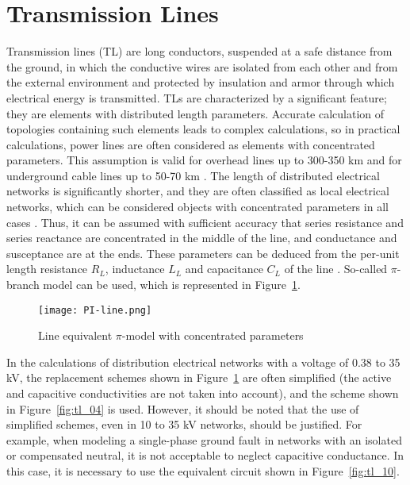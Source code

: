 \section{Transmission Lines}\label{sec:ch3/sec3}
Transmission lines (TL) are long conductors, suspended at a safe distance from the ground, in which the conductive wires are isolated from each other and from the external environment and protected by insulation and armor through which electrical energy is transmitted. TLs are characterized by a significant feature; they are elements with distributed length parameters. Accurate calculation of topologies containing such elements leads to complex calculations, so in practical calculations, power lines are often considered as elements with concentrated parameters. This assumption is valid for overhead lines up to 300-350 km and for underground cable lines up to 50-70 km \autocite{Gerasimenko2008}. The length of distributed electrical networks is significantly shorter, and they are often classified as local electrical networks, which can be considered objects with concentrated parameters in all cases \autocite{borovikov1977electric}. Thus, it can be assumed with sufficient accuracy that series resistance and series reactance are concentrated in the middle of the line, and conductance and susceptance are at the ends. These parameters can be deduced from the per-unit length resistance $R_L$, inductance $L_L$ and capacitance $C_L$ of the line \autocite{LIU2023109321}. So-called $\pi$-branch model can be used, which is represented in Figure~\cref{fig:pi_branch}. 

\begin{figure}[htbp]
    \centering
    \texttt{[image: PI-line.png]}
    \caption{Line equivalent $\pi$-model with concentrated parameters}
    \label{fig:pi_branch}
\end{figure}

In the calculations of distribution electrical networks with a voltage of 0.38 to 35 kV, the replacement schemes shown in Figure~\cref{fig:pi_branch} are often simplified (the active and capacitive conductivities are not taken into account), and the scheme shown in Figure~\cref{fig:tl_04} is used. However, it should be noted that the use of simplified schemes, even in 10 to 35 kV networks, should be justified. For example, when modeling a single-phase ground fault in networks with an isolated or compensated neutral, it is not acceptable to neglect capacitive conductance. In this case, it is necessary to use the equivalent circuit shown in Figure~\cref{fig:tl_10}.

